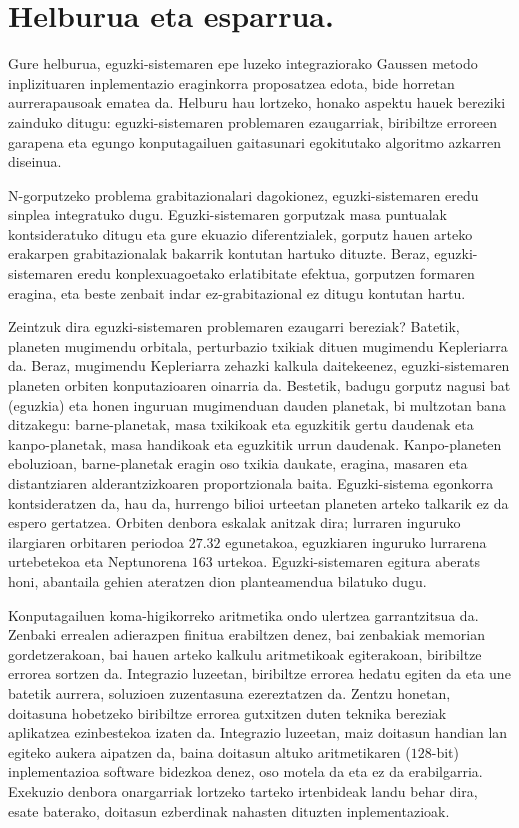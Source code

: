 \section{Helburua eta esparrua.}

Gure helburua, eguzki-sistemaren epe luzeko integraziorako Gaussen metodo inplizituaren inplementazio eraginkorra proposatzea edota, bide horretan aurrerapausoak ematea da. Helburu hau lortzeko, honako aspektu hauek bereziki zainduko ditugu: eguzki-sistemaren problemaren ezaugarriak, biribiltze erroreen garapena eta egungo konputagailuen gaitasunari egokitutako algoritmo azkarren diseinua.  

N-gorputzeko problema grabitazionalari dagokionez, eguzki-sistemaren eredu sinplea integratuko dugu. Eguzki-sistemaren gorputzak masa puntualak kontsideratuko ditugu eta gure ekuazio diferentzialek, gorputz hauen arteko erakarpen grabitazionalak bakarrik kontutan hartuko dituzte. Beraz, eguzki-sistemaren eredu konplexuagoetako erlatibitate efektua, gorputzen formaren eragina, eta beste zenbait indar ez-grabitazional ez ditugu kontutan hartu.

Zeintzuk dira eguzki-sistemaren problemaren ezaugarri bereziak? Batetik, planeten mugimendu orbitala, perturbazio txikiak dituen mugimendu Kepleriarra da. Beraz, mugimendu Kepleriarra  zehazki kalkula daitekeenez, eguzki-sistemaren planeten orbiten konputazioaren oinarria da. Bestetik,  badugu gorputz nagusi bat (eguzkia) eta honen inguruan mugimenduan dauden planetak, bi multzotan bana ditzakegu: barne-planetak, masa txikikoak eta eguzkitik gertu daudenak eta kanpo-planetak, masa handikoak eta eguzkitik urrun daudenak. Kanpo-planeten eboluzioan, barne-planetak eragin oso txikia daukate, eragina, masaren eta distantziaren alderantzizkoaren proportzionala baita.  Eguzki-sistema egonkorra kontsideratzen da, hau da, hurrengo bilioi urteetan planeten arteko talkarik ez da espero gertatzea. Orbiten denbora eskalak anitzak dira; lurraren inguruko ilargiaren orbitaren periodoa $27.32$ egunetakoa, eguzkiaren inguruko lurrarena urtebetekoa eta Neptunorena $163$ urtekoa.  Eguzki-sistemaren egitura aberats honi, abantaila gehien ateratzen dion planteamendua bilatuko dugu.
  
Konputagailuen koma-higikorreko aritmetika ondo ulertzea garrantzitsua da. Zenbaki errealen adierazpen finitua erabiltzen denez, bai zenbakiak memorian gordetzerakoan, bai hauen arteko kalkulu aritmetikoak egiterakoan, biribiltze errorea sortzen da. Integrazio luzeetan, biribiltze errorea hedatu egiten da eta une batetik aurrera, soluzioen zuzentasuna ezereztatzen da. Zentzu honetan, doitasuna hobetzeko biribiltze errorea gutxitzen duten teknika bereziak aplikatzea ezinbestekoa izaten da. Integrazio luzeetan, maiz doitasun handian lan egiteko aukera aipatzen da, baina doitasun altuko aritmetikaren ($128$-bit) inplementazioa software bidezkoa denez, oso motela da eta ez da erabilgarria. Exekuzio denbora onargarriak lortzeko tarteko irtenbideak landu behar dira, esate baterako, doitasun ezberdinak nahasten dituzten inplementazioak.       

